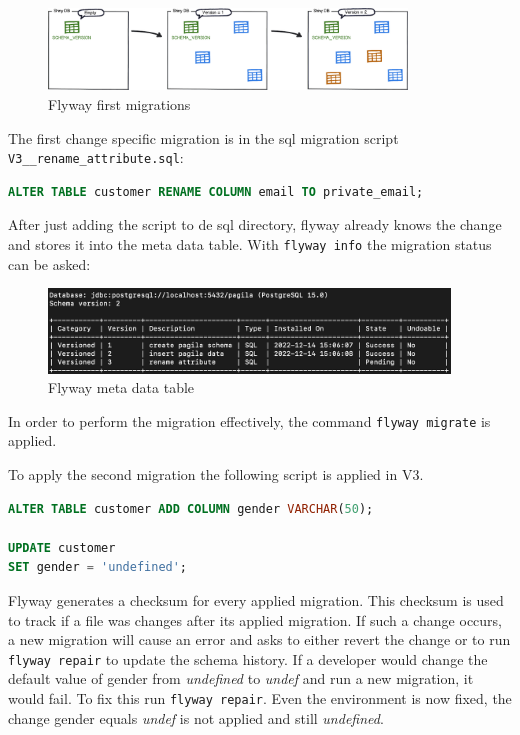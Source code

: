 \begin{figure}[H]
	\centering
	\includegraphics[width=0.85\textwidth]{./chapters/scenarios/images/Migration-1-2}
	\caption[Flyway first migrations - Source: \cite{FlywayGetStarted}]{Flyway first migrations}
	\label{fig:Migration-1-2}
\end{figure}


%
The first change specific migration is in the sql migration script\\ \texttt{V3\_\_rename\_attribute.sql}:
\begin{lstlisting}[language=SQL]
ALTER TABLE customer RENAME COLUMN email TO private_email;
\end{lstlisting}
After just adding the script to de sql directory, flyway already knows the change and stores it into the meta data table. With \texttt{flyway info} the migration status can be asked:

\begin{figure}[H]
	\centering
	\includegraphics[width=0.95\textwidth]{./chapters/scenarios/images/flyway_metadata_v2}
	\caption[Flyway meta data table - Source: Own illustration]{Flyway meta data table}
\end{figure}
In order to perform the migration effectively, the command \texttt{flyway migrate} is applied.



%
To apply the second migration the following script is applied in V3.
\begin{lstlisting}[language=SQL]
ALTER TABLE customer ADD COLUMN gender VARCHAR(50);

UPDATE customer
SET gender = 'undefined';
\end{lstlisting}
Flyway generates a checksum for every applied migration. This checksum is used to track if a file was changes after its applied migration. If such a change occurs, a new migration will cause an error and asks to either revert the change or to run \texttt{flyway repair} to update the schema history.
If a developer would change the default value of gender from \textit{undefined} to \textit{undef} and run a new migration, it would fail. To fix this run \texttt{flyway repair}. Even the environment is now fixed, the change gender equals \textit{undef} is not applied and still \textit{undefined}.



